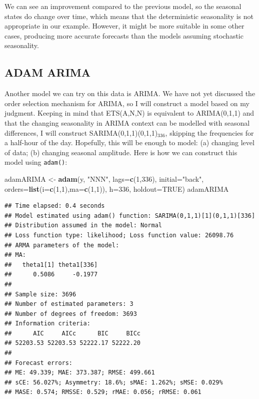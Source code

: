 \documentclass[]{book}
\newenvironment{Shaded}{\begin{snugshade}}{\end{snugshade}}
\newcommand{\DataTypeTok}[1]{\textcolor[rgb]{0.13,0.29,0.53}{#1}}
\newcommand{\DecValTok}[1]{\textcolor[rgb]{0.00,0.00,0.81}{#1}}
\newcommand{\KeywordTok}[1]{\textcolor[rgb]{0.13,0.29,0.53}{\textbf{#1}}}
\newcommand{\NormalTok}[1]{#1}
\newcommand{\OtherTok}[1]{\textcolor[rgb]{0.56,0.35,0.01}{#1}}
\newcommand{\StringTok}[1]{\textcolor[rgb]{0.31,0.60,0.02}{#1}}
\theoremstyle{definition}
\theoremstyle{definition}
\theoremstyle{definition}
\theoremstyle{definition}
\theoremstyle{remark}
\begin{document}
We can see an improvement compared to the previous model, so the seasonal states do change over time, which means that the deterministic seasonality is not appropriate in our example. However, it might be more suitable in some other cases, producing more accurate forecasts than the models assuming stochastic seasonality.

\hypertarget{adam-arima}{%
\subsection{ADAM ARIMA}\label{adam-arima}}

Another model we can try on this data is ARIMA. We have not yet discussed the order selection mechanism for ARIMA, so I will construct a model based on my judgment. Keeping in mind that ETS(A,N,N) is equivalent to ARIMA(0,1,1) and that the changing seasonality in ARIMA context can be modelled with seasonal differences, I will construct SARIMA(0,1,1)(0,1,1)\(_{336}\), skipping the frequencies for a half-hour of the day. Hopefully, this will be enough to model: (a) changing level of data; (b) changing seasonal amplitude. Here is how we can construct this model using \texttt{adam()}:

\begin{Shaded}
\begin{Highlighting}[]
\NormalTok{adamARIMA <-}\StringTok{ }\KeywordTok{adam}\NormalTok{(y, }\StringTok{"NNN"}\NormalTok{, }\DataTypeTok{lags=}\KeywordTok{c}\NormalTok{(}\DecValTok{1}\NormalTok{,}\DecValTok{336}\NormalTok{), }\DataTypeTok{initial=}\StringTok{"back"}\NormalTok{,}
                  \DataTypeTok{orders=}\KeywordTok{list}\NormalTok{(}\DataTypeTok{i=}\KeywordTok{c}\NormalTok{(}\DecValTok{1}\NormalTok{,}\DecValTok{1}\NormalTok{),}\DataTypeTok{ma=}\KeywordTok{c}\NormalTok{(}\DecValTok{1}\NormalTok{,}\DecValTok{1}\NormalTok{)),}
                  \DataTypeTok{h=}\DecValTok{336}\NormalTok{, }\DataTypeTok{holdout=}\OtherTok{TRUE}\NormalTok{)}
\NormalTok{adamARIMA}
\end{Highlighting}
\end{Shaded}

\begin{verbatim}
## Time elapsed: 0.4 seconds
## Model estimated using adam() function: SARIMA(0,1,1)[1](0,1,1)[336]
## Distribution assumed in the model: Normal
## Loss function type: likelihood; Loss function value: 26098.76
## ARMA parameters of the model:
## MA:
##   theta1[1] theta1[336] 
##      0.5086     -0.1977 
## 
## Sample size: 3696
## Number of estimated parameters: 3
## Number of degrees of freedom: 3693
## Information criteria:
##      AIC     AICc      BIC     BICc 
## 52203.53 52203.53 52222.17 52222.20 
## 
## Forecast errors:
## ME: 49.339; MAE: 373.387; RMSE: 499.661
## sCE: 56.027%; Asymmetry: 18.6%; sMAE: 1.262%; sMSE: 0.029%
## MASE: 0.574; RMSSE: 0.529; rMAE: 0.056; rRMSE: 0.061
\end{verbatim}
\end{document}
